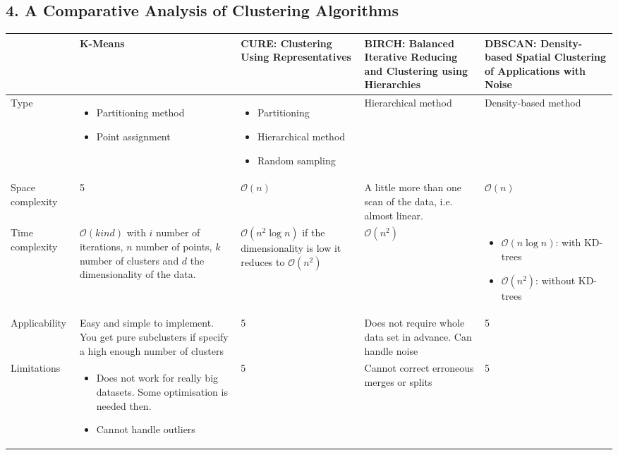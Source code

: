 \documentclass[11pt,a4paper]{article}
\begin{document}
\begin{landscape}
\subsection*{4. A Comparative Analysis of Clustering Algorithms}
\begin{table}[H]
\def\arraystretch{1.2}
\begin{tabular}{p{2cm}||p{5.5cm}|p{5.5cm}|p{5.5cm}|p{5.5cm}}
&K-Means&CURE: Clustering Using Representatives& BIRCH: Balanced Iterative Reducing and Clustering using Hierarchies & DBSCAN: Density-based Spatial Clustering of Applications with Noise \\
\hline
\hline Type &
\begin{itemize}
\itemsep0em
\item Partitioning method
\item Point assignment
\end{itemize}
& 
\begin{itemize}
\item Partitioning
\item Hierarchical method
\item Random sampling
\end{itemize}

&
Hierarchical method
&
Density-based method\\


\hline
Space complexity&5&$\mathcal{O}(n)$&A little more than one scan of the data, i.e. almost linear.
&$\mathcal{O}(n)$\\


\hline Time complexity
&$\mathcal{O}(kind)$ with $i$ number of iterations, $n$ number of points, $k$ number of clusters and $d$ the dimensionality of the data. 
&$\mathcal{O}(n^2\log{n})$ if the dimensionality is low it reduces to $\mathcal{O}(n^2)$
&
$\mathcal{O}(n^2)$
&
\begin{itemize}
\item $\mathcal{O}(n\log{n})$: with KD-trees
\item $\mathcal{O}(n^2)$: without KD-trees
\end{itemize}
\\
\hline
Applicability&Easy and simple to implement. You get pure subclusters if specify a high enough number of clusters&5&Does not require whole data set in advance. Can handle noise&5\\
\hline
Limitations&\begin{itemize} \itemsep0em \item Does not work for really big datasets. Some optimisation is needed then. \item Cannot handle outliers \end{itemize}&5&Cannot correct erroneous merges or splits&5\\

\end{tabular}
\end{table}
\end{landscape}

\nocite{*}
\printbibliography
\end{document}
